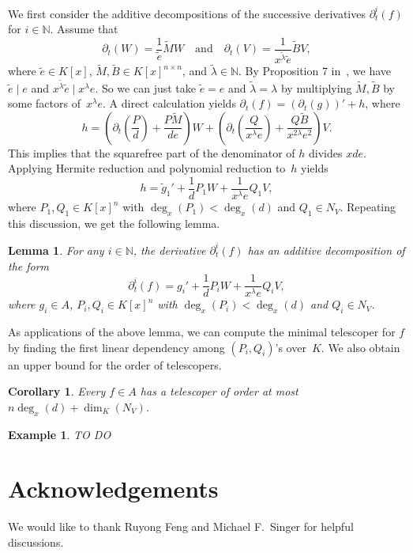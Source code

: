 \documentclass{sig-alternate}
\newtheorem{corollary}[theorem]{Corollary}
\newtheorem{lemma}[theorem]{Lemma}
\newtheorem{example}[theorem]{Example}
\newcommand{\bN}{ {\mathbb N}}
\begin{document}
We first consider the additive decompositions of the successive derivatives $\partial_t^i(f)$ for $i\in \bN$.
Assume that
\[\partial_t(W) = \frac{1}{\tilde{e}} \tilde{M}W \quad \text{and}
\quad \partial_t(V) = \frac{1}{x^{\tilde{\lambda}} \tilde{e}} \tilde{B}V,\]
where $\tilde e \in K[x]$, $\tilde M, \tilde B\in K[x]^{n\times n}$, and $\tilde \lambda \in \bN$.
By Proposition 7 in~\cite{chen14a}, we have $\tilde e \mid e$ and $x^{\tilde{\lambda}} \tilde{e} \mid x^\lambda e$.
So we can just take $\tilde e = e$ and $\tilde{\lambda}  = \lambda$ by multiplying $\tilde M, \tilde B$ by some factors
of~$x^\lambda e$. A direct calculation yields $\partial_t(f) = (\partial_t(g))' + h$,
where
\[h = \left(\partial_t(\frac{P}{d})+\frac{P\tilde M}{de}\right)W + \left(\partial_t(\frac{Q}{x^\lambda e})+ \frac{Q\tilde B}{x^{2\lambda} e^2}\right)V.\]
This implies that the squarefree part of the denominator of $h$ divides $xde$. Applying Hermite reduction and polynomial reduction
to~$h$ yields
\[ h = \tilde g_1' + \frac{1}{d} P_1W + \frac{1}{x^\lambda e} Q_1V,\]
where $P_1, Q_1\in K[x]^n$ with $\deg_x(P_1) < \deg_x(d)$ and $Q_1\in N_V$.
Repeating this discussion, we get the following lemma.
\begin{lemma}\label{LEM:idtf}
For any $i\in \bN$, the derivative $\partial_t^i(f)$ has an additive decomposition of the form
\[ \partial_t^i(f) = g_i' + \frac{1}{d} P_iW + \frac{1}{x^\lambda e} Q_iV,\]
where $g_i\in A$, $P_i, Q_i\in K[x]^n$ with $\deg_x(P_i) < \deg_x(d)$ and $Q_i\in N_V$.
\end{lemma}
As applications of the above lemma, we can compute the minimal telescoper for $f$ by finding the first
linear dependency among $(P_i, Q_i)$'s over~$K$. We also obtain an upper bound for the order of telescopers.
\begin{corollary}
Every $f\in A$ has a telescoper of order at most $n\deg_x(d) + \dim_K(N_V)$.
\end{corollary}

\begin{example}
TO DO
\end{example}

\section*{Acknowledgements}

We would like to thank Ruyong Feng and Michael F.\ Singer for helpful discussions.



\end{document}
